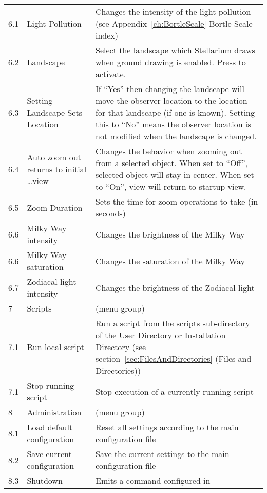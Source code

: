 \begin{longtable}{l|p{45mm}|p{85mm}}
6.1  & Light Pollution & Changes the intensity of the light pollution (see Appendix~\ref{ch:BortleScale} Bortle Scale index)\\%
6.2  & Landscape       & Select the landscape which Stellarium draws when ground drawing is enabled. Press \key{\return} to activate.\\%
6.3  & Setting Landscape Sets Location & If ``Yes'' then changing the landscape will move the observer location to the location for that landscape (if one is known). 
                                         Setting this to ``No'' means the observer location is not modified when the landscape is changed.\\%
6.4  & Auto zoom out returns to initial \ldots view & Changes the behavior when zooming out from a selected object.
                                                      When set to ``Off'', selected object will stay in center.
                                                      When set to ``On'', view will return to startup view. \\%
6.5  & Zoom Duration              & Sets the time for zoom operations to take (in seconds)\\%
6.6  & Milky Way intensity        & Changes the brightness of the Milky Way\\%
6.6  & Milky Way saturation       & Changes the saturation of the Milky Way\\%
6.7  & Zodiacal light intensity   & Changes the brightness of the Zodiacal light\\\midrule
7    & Scripts                    & (menu group)\\%
7.1  & Run local script           & Run a script from the scripts sub-directory of the User Directory or Installation Directory 
                                   (see section~\ref{sec:FilesAndDirectories} (Files and Directories))\\%
7.1  & Stop running script        & Stop execution of a currently running script \\\midrule
8    & Administration             & (menu group)\\%
8.1  & Load default configuration & Reset all settings according to the main configuration file\\%
8.2  & Save current configuration & Save the current settings to the main configuration file\\%
8.3  & Shutdown                   & Emits a command configured in \\\midrule
\end{longtable}


